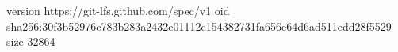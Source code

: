 version https://git-lfs.github.com/spec/v1
oid sha256:30f3b52976c783b283a2432e01112e154382731fa656e64d6ad511edd28f5529
size 32864
